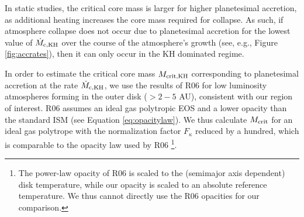 \documentclass[apj]{emulateapj}
\newcommand{\co}{_{\rm c}}
\begin{document}
In static studies, the critical core mass is larger for higher planetesimal accretion, as additional heating increases the core mass required for collapse. As such, if atmosphere collapse does not occur due to planetesimal accretion for the lowest value of $\dot{M}_{\rm c, KH}$ over the course of the atmosphere's growth (see, e.g., Figure \ref{fig:accrates}), then it can only occur in the KH dominated regime. %







In order to estimate the critical core mass $M_{\rm crit, KH}$ corresponding to planetesimal accretion at the rate $\dot{M}_{\rm c, KH}$, we use the results of R06 for low luminosity atmospheres forming in the outer disk ($>2-5$ AU), consistent with our region of interest. R06 assumes an ideal gas polytropic EOS and a lower opacity than the standard ISM (see Equation \ref{eq:opacitylaw}). We thus calculate $M_{\rm crit}$ for an ideal gas polytrope with the normalization factor $F_{\kappa}$ reduced by a hundred, which is comparable to the opacity law used by R06 \footnote{The power-law opacity of R06 is scaled to the (semimajor axis dependent) disk temperature, while our opacity is scaled to an absolute reference temperature. We thus cannot directly use the R06 opacities for our comparison.}. %
\end{document}

